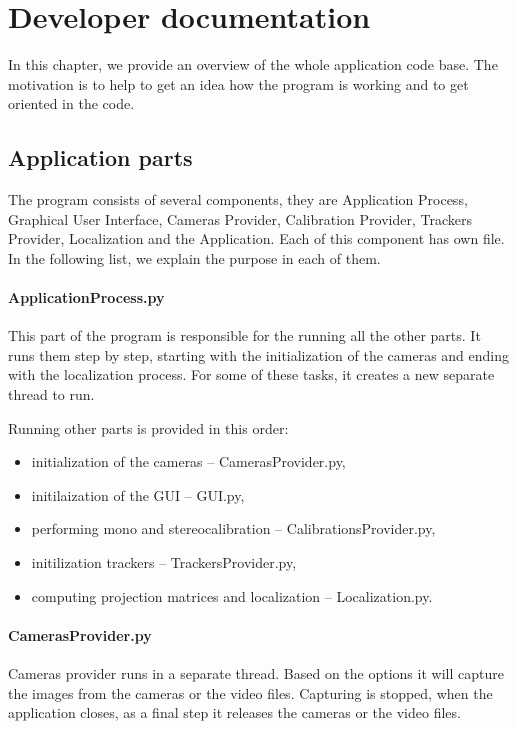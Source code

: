 \chapter{Developer documentation}

In this chapter, we provide an overview of the whole application code base. The
motivation is to help to get an idea how the program is working and to get
oriented in the code.

\section{Application parts}

The program consists of several components, they are Application Process,
Graphical User Interface, Cameras Provider, Calibration Provider, Trackers
Provider, Localization and the Application. Each of this component has own
file. In the following list, we explain the purpose in each of them.

\subsubsection*{ApplicationProcess.py}

This part of the program is responsible for the running all the other parts.
It runs them step by step, starting with the initialization of the cameras and
ending with the localization process. For some of these tasks, it creates a new
separate thread to run.

Running other parts is provided in this order: 
\begin{itemize} 
\item initialization of the cameras -- CamerasProvider.py, \item initilaization
of the GUI -- GUI.py, \item performing mono and stereocalibration --
CalibrationsProvider.py, \item initilization trackers -- TrackersProvider.py,
\item computing projection matrices and localization -- Localization.py.
\end{itemize}

\subsubsection*{CamerasProvider.py}

Cameras provider runs in a separate thread. Based on the options it will
capture the images from the cameras or the video files. Capturing is stopped,
when the application closes, as a final step it releases the cameras or the
video files.

